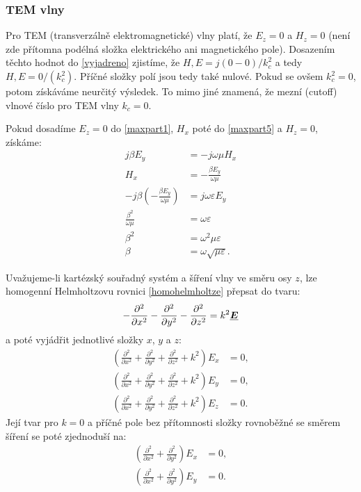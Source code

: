 \documentclass[12pt,a4paper,oneside]{article}
\numberwithin{equation}{section} %
\numberwithin{figure}{section} %
\numberwithin{table}{section} %
\renewcommand{\vec}[1]{\mbox{\boldmath$#1$}} %
\newcommand{\faz}[1]{{\underline{#1}}} %
\begin{document}
\subsubsection{TEM vlny}
Pro TEM (transverzálně elektromagnetické) vlny platí, že $E_z = 0$ a $H_z = 0$ (není zde přítomna podélná složka elektrického ani magnetického pole). Dosazením těchto hodnot do \ref{vyjadreno} zjistíme, že $H, E = j (0-0) / k^2_c$ a tedy $H, E = 0 / (k^2_c)$. Příčné složky polí jsou tedy také nulové. Pokud se ovšem $k^2_c = 0$, potom získáváme neurčitý výsledek. To mimo jiné znamená, že mezní (cutoff) vlnové číslo pro TEM vlny $k_c = 0$.

Pokud dosadíme $E_z = 0$ do \ref{maxpart1}, $H_x$ poté do \ref{maxpart5} a $H_z = 0$, získáme:
\begin{align*}
j \beta E_y &= -j \omega \mu H_x
\\
H_x &= - \frac{\beta E_y}{\omega \mu}
\\
-j \beta \left( - \frac{\beta E_y}{\omega \mu} \right) &= j \omega \varepsilon E_y
\\
\frac{\beta ^2}{\omega \mu} &= \omega \varepsilon
\\
\beta ^2 &= \omega ^2 \mu \varepsilon
\\
\beta &= \omega \sqrt{\mu \varepsilon} .
\end{align*}


Uvažujeme-li kartézský souřadný systém a šíření vlny ve směru osy $z$, lze homogenní Helmholtzovu rovnici \ref{homohelmholtze} přepsat do tvaru:
\begin{equation}
- \frac{\partial ^2}{\partial x^2} - \frac{\partial ^2}{\partial y^2} - \frac{\partial ^2}{\partial z^2} = k^2 \faz{\vec{E}}
\end{equation}
a poté vyjádřit jednotlivé složky $x$, $y$ a $z$:
\begin{subequations}
\begin{align}
\left( \frac{\partial ^2}{\partial x^2} + \frac{\partial ^2}{\partial y^2} + \frac{\partial ^2}{\partial z^2} + k^2 \right) E_x &= 0 , 
\\
\left( \frac{\partial ^2}{\partial x^2} + \frac{\partial ^2}{\partial y^2} + \frac{\partial ^2}{\partial z^2} + k^2 \right) E_y &= 0 ,
\\
\left( \frac{\partial ^2}{\partial x^2} + \frac{\partial ^2}{\partial y^2} + \frac{\partial ^2}{\partial z^2} + k^2 \right) E_z &= 0 .
\end{align}
\end{subequations}
Její tvar pro $k = 0$ a příčné pole bez přítomnosti složky rovnoběžné se směrem šíření se poté zjednoduší na:
\begin{subequations}
\begin{align}
\left( \frac{\partial ^2}{\partial x^2} + \frac{\partial ^2}{\partial y^2} \right) E_x &= 0 ,
\\
\left( \frac{\partial ^2}{\partial x^2} + \frac{\partial ^2}{\partial y^2} \right) E_y &= 0 .
\end{align}
\end{subequations}
\end{document}
